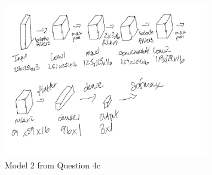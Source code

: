 \documentclass[12pt]{article}
\begin{document}
\begin{enumerate}
          \begin{figure}
              \centering
              \includegraphics[width=0.8\textwidth]{assets/test2/model2.png}
              \caption{Model 2 from Question 4c}
              \label{fig:model2}
          \end{figure}
\end{enumerate}
\end{document}

